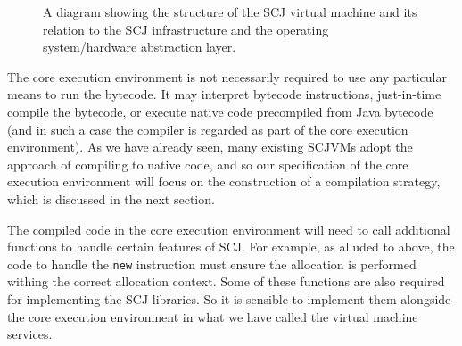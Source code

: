 \documentclass[a4paper,10pt]{report}
\begin{document}
\begin{figure}[ht]
  \centering
  \caption{A diagram showing the structure of the SCJ virtual machine
    and its relation to the SCJ infrastructure and the operating
    system/hardware abstraction layer.}
  \label{scjvm-fig}
\end{figure}

The core execution environment is not necessarily required to use any
particular means to run the bytecode.
It may interpret bytecode instructions, just-in-time compile the
bytecode, or execute native code precompiled from Java bytecode (and
in such a case the compiler is regarded as part of the core execution
environment).
As we have already seen, many existing SCJVMs adopt the approach of
compiling to native code, and so our specification of the core
execution environment will focus on the construction of a compilation
strategy, which is discussed in the next section.

The compiled code in the core execution environment will need to call
additional functions to handle certain features of SCJ.
For example, as alluded to above, the code to handle the \texttt{new}
instruction must ensure the allocation is performed withing the
correct allocation context.
Some of these functions are also required for implementing the SCJ
libraries.
So it is sensible to implement them alongside the core execution
environment in what we have called the virtual machine services.
\end{document}
